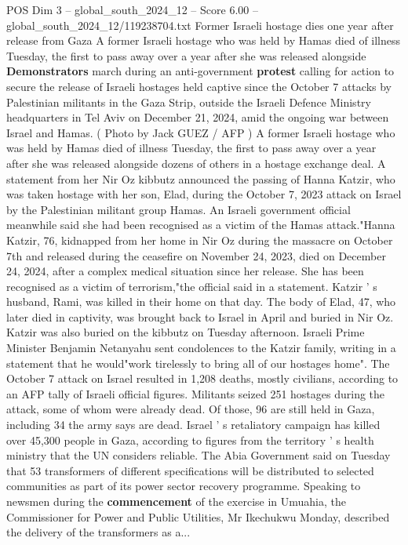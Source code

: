 \begin{textsample}{POS Dim 3 – global\_south\_2024\_12 – Score 6.00 – global\_south\_2024\_12/119238704.txt}  \label{ex:f3_pos_393}
Former Israeli hostage dies one year after release from Gaza A former Israeli hostage who was held by Hamas died of illness Tuesday, the first to pass away over a year after she was released alongside \textbf{Demonstrators} march during an anti-government \textbf{protest} calling for action to secure the release of Israeli hostages held captive since the October 7 attacks by Palestinian militants in the Gaza Strip, outside the Israeli Defence Ministry headquarters in Tel Aviv on December 21, 2024, amid the ongoing war between Israel and Hamas. ( Photo by Jack GUEZ / AFP ) A former Israeli hostage who was held by Hamas died of illness Tuesday, the first to pass away over a year after she was released alongside dozens of others in a hostage exchange deal.
A statement from her Nir Oz kibbutz announced the passing of Hanna Katzir, who was taken hostage with her son, Elad, during the October 7, 2023 attack on Israel by the Palestinian militant group Hamas.
An Israeli government official meanwhile said she had been recognised as a victim of the Hamas attack."Hanna Katzir, 76, kidnapped from her home in Nir Oz during the massacre on October 7th and released during the ceasefire on November 24, 2023, died on December 24, 2024, after a complex medical situation since her release.
She has been recognised as a victim of terrorism,"the official said in a statement.
Katzir ' s husband, Rami, was killed in their home on that day.
The body of Elad, 47, who later died in captivity, was brought back to Israel in April and buried in Nir Oz.
Katzir was also buried on the kibbutz on Tuesday afternoon.
Israeli Prime Minister Benjamin Netanyahu sent condolences to the Katzir family, writing in a statement that he would"work tirelessly to bring all of our hostages home".
The October 7 attack on Israel resulted in 1,208 deaths, mostly civilians, according to an AFP tally of Israeli official figures.
Militants seized 251 hostages during the attack, some of whom were already dead.
Of those, 96 are still held in Gaza, including 34 the army says are dead.
Israel ' s retaliatory campaign has killed over 45,300 people in Gaza, according to figures from the territory ' s health ministry that the UN considers reliable.
The Abia Government said on Tuesday that 53 transformers of different specifications will be distributed to selected communities as part of its power sector recovery programme.
Speaking to newsmen during the \textbf{commencement} of the exercise in Umuahia, the Commissioner for Power and Public Utilities, Mr Ikechukwu Monday, described the delivery of the transformers as a...

\end{textsample}
